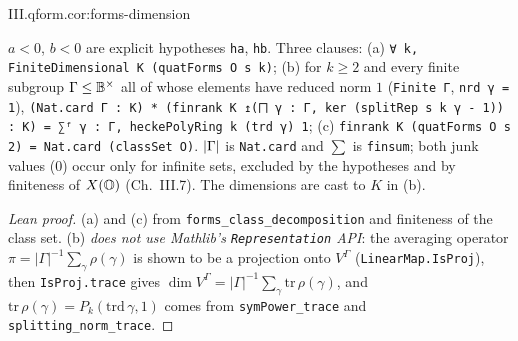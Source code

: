 \begin{tfformal}{III.qform.cor:forms-dimension}
\begin{tffidelity}
$a<0$, $b<0$ are explicit hypotheses \texttt{ha}, \texttt{hb}. Three clauses: (a) \texttt{∀ k, FiniteDimensional K (quatForms O s k)}; (b) for $k\ge2$ and every finite subgroup $\Gamma\le\mathbb{B}^\times$ all of whose elements have reduced norm $1$ (\texttt{Finite Γ}, \texttt{nrd γ = 1}), \texttt{(Nat.card Γ : K) * (finrank K ↥(⨅ γ : Γ, ker (splitRep s k γ - 1)) : K) = ∑ᶠ γ : Γ, heckePolyRing k (trd γ) 1}; (c) \texttt{finrank K (quatForms O s 2) = Nat.card (classSet O)}. $\lvert\Gamma\rvert$ is \texttt{Nat.card} and $\sum$ is \texttt{finsum}; both junk values ($0$) occur only for infinite sets, excluded by the hypotheses and by finiteness of $X(\mathbb{O})$ (Ch.~III.7). The dimensions are cast to $K$ in (b).
\end{tffidelity}
\end{tfformal}
\begin{proof}[Lean proof]
(a) and (c) from \texttt{forms\_class\_decomposition} and finiteness of the class set. (b) \emph{does not use Mathlib's \texttt{Representation} API}: the averaging operator $\pi=|\Gamma|^{-1}\sum_\gamma\rho(\gamma)$ is shown to be a projection onto $V^\Gamma$ (\texttt{LinearMap.IsProj}), then \texttt{IsProj.trace} gives $\dim V^\Gamma=|\Gamma|^{-1}\sum_\gamma\mathrm{tr}\,\rho(\gamma)$, and $\mathrm{tr}\,\rho(\gamma)=P_k(\mathrm{trd}\,\gamma,1)$ comes from \texttt{symPower\_trace} and \texttt{splitting\_norm\_trace}.
\end{proof}

